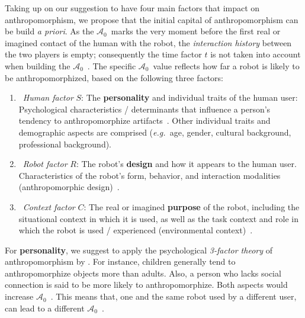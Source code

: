 \documentclass{frontiersSCNS} %
\newcommand{\eg}{{\textit{e.g.~}}}
\newcommand{\ICA}{{$\mathcal{A}_0$~}}
\begin{document}
Taking up on our suggestion to have four main factors that impact on anthropomorphism, we propose that the initial capital of anthropomorphism can be build \emph{a priori}.
As the \ICA marks the very moment before the first real or imagined contact of the human with the robot, the \textit{interaction history} between the two players is empty; consequently the time factor $t$ is not taken into account when building the \ICA.
The specific \ICA value reflects how far a robot is likely to be anthropomorphized, based on the following three factors:

\begin{enumerate}

    \item ~\emph{Human factor} $S$: The \textbf{personality} and individual
        traits of the human user: Psychological characteristics / determinants
        that influence a person's tendency to anthropomorphize
        artifacts~\citep{epley_seeing_2007}. Other individual traits and
        demographic aspects are comprised (\eg age, gender, cultural background,
        professional background).

    \item ~\emph{Robot factor} $R$: The robot's \textbf{design} and how it
        appears to the human user. Characteristics of the robot's form,
        behavior, and interaction modalities (anthropomorphic
        design)~\citep{fong_survey_2003}.

    \item ~\emph{Context factor} $C$: The real or imagined
        \textbf{purpose} of the robot, including the situational context in
        which it is used, as well as the task context and role in which the
        robot is used / experienced (environmental
        context)~\citep{joosse_what_2013}.

\end{enumerate}	


For \textbf{personality}, we suggest to apply the
psychological \textit{3-factor theory} of anthropomorphism by \citet{epley_seeing_2007}. For instance,
children generally tend to anthropomorphize objects more than adults. Also, a
person who lacks social connection is said to be more likely to
anthropomorphize. Both aspects would increase \ICA. This means that, one and the
same robot used by a different user, can lead to a different \ICA.
\end{document}
